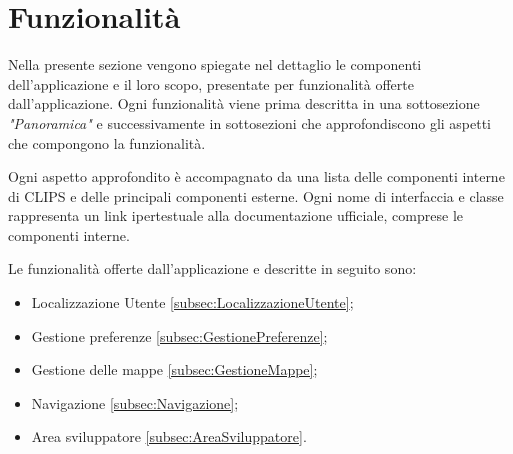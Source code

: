 \documentclass[../ManualeSviluppatore.tex]{subfiles}
\begin{document}
\section{Funzionalità}
	Nella presente sezione vengono spiegate nel dettaglio le componenti dell'applicazione e il loro scopo, presentate per funzionalità offerte dall'applicazione.
	Ogni funzionalità viene prima descritta in una sottosezione \textit{"Panoramica"} e successivamente in sottosezioni che approfondiscono gli aspetti che compongono la funzionalità. 
	
	Ogni aspetto approfondito è accompagnato da una lista delle componenti interne di CLIPS e delle principali componenti esterne. Ogni nome di interfaccia e classe rappresenta un link ipertestuale alla documentazione ufficiale, comprese le componenti interne. 
	
	Le funzionalità offerte dall'applicazione e descritte in seguito sono:
	\begin{itemize}
		\item Localizzazione Utente \ref{subsec:LocalizzazioneUtente};
		\item Gestione preferenze \ref{subsec:GestionePreferenze};
		\item Gestione delle mappe \ref{subsec:GestioneMappe};
		\item Navigazione \ref{subsec:Navigazione};
		\item Area sviluppatore \ref{subsec:AreaSviluppatore}.
	\end{itemize}
	
	\newpage
		
	
	\newpage
		
	
	\newpage
		
	
	\newpage
		
	
	\newpage
		
\end{document}
